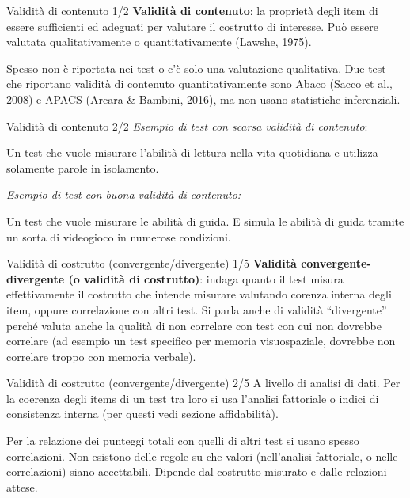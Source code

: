 \documentclass[
  ignorenonframetext,
]{beamer}
\begin{document}
\begin{frame}{Validità di contenuto 1/2}
\label{validituxe0-di-contenuto-12}
\textbf{Validità di contenuto}: la proprietà degli item di essere
sufficienti ed adeguati per valutare il costrutto di interesse. Può
essere valutata qualitativamente o quantitativamente (Lawshe, 1975).

\vfill

Spesso non è riportata nei test o c'è solo una valutazione qualitativa.
Due test che riportano validità di contenuto quantitativamente sono
Abaco (Sacco et al., 2008) e APACS (Arcara \& Bambini, 2016), ma non
usano statistiche inferenziali.
\end{frame}

\begin{frame}{Validità di contenuto 2/2}
\label{validituxe0-di-contenuto-22}
\emph{Esempio di test con scarsa validità di contenuto}:

Un test che vuole misurare l'abilità di lettura nella vita quotidiana e
utilizza solamente parole in isolamento.

\vfill

\emph{Esempio di test con buona validità di contenuto:}

Un test che vuole misurare le abilità di guida. E simula le abilità di
guida tramite un sorta di videogioco in numerose condizioni.
\end{frame}

\begin{frame}{Validità di costrutto (convergente/divergente) 1/5}
\label{validituxe0-di-costrutto-convergentedivergente-15}
\textbf{Validità convergente-divergente (o validità di costrutto)}:
indaga quanto il test misura effettivamente il costrutto che intende
misurare valutando corenza interna degli item, oppure correlazione con
altri test. Si parla anche di validità ``divergente'' perché valuta
anche la qualità di non correlare con test con cui non dovrebbe
correlare (ad esempio un test specifico per memoria visuospaziale,
dovrebbe non correlare troppo con memoria verbale).
\end{frame}

\begin{frame}{Validità di costrutto (convergente/divergente) 2/5}
\label{validituxe0-di-costrutto-convergentedivergente-25}
A livello di analisi di dati. Per la coerenza degli items di un test tra
loro si usa l'analisi fattoriale o indici di consistenza interna (per
questi vedi sezione affidabilità).

\vfill

Per la relazione dei punteggi totali con quelli di altri test si usano
spesso correlazioni. Non esistono delle regole su che valori
(nell'analisi fattoriale, o nelle correlazioni) siano accettabili.
Dipende dal costrutto misurato e dalle relazioni attese.
\end{frame}
\end{document}
